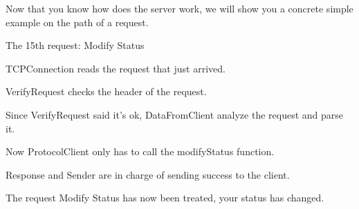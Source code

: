 \documentclass{article}
\begin{document}
  Now that you know how does the server work, we will show you a concrete simple example on the path of a request.

  \bigskip
  The 15th request: Modify Status

  \bigskip
  TCPConnection reads the request that just arrived.

  \bigskip
  VerifyRequest checks the header of the request.

  \bigskip
  Since VerifyRequest said it's ok, DataFromClient analyze the request and parse it.

  \bigskip
  Now ProtocolClient only has to call the modifyStatus function.

  \bigskip
  Response and Sender are in charge of sending success to the client.

  \bigskip
  The request Modify Status has now been treated, your status has changed.
\end{document}
